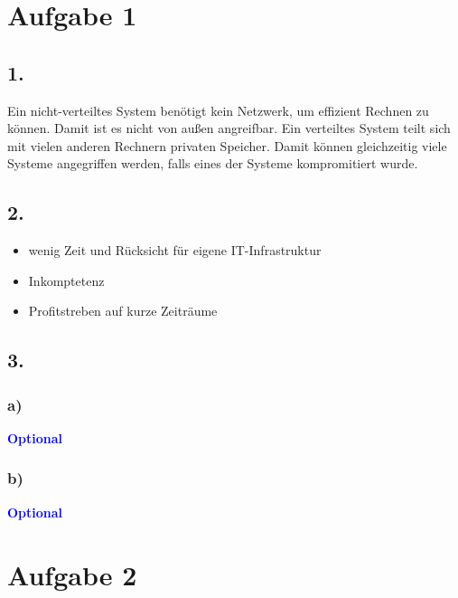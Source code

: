 \documentclass[a4paper,11pt]{scrartcl}
\title{\titleinfo}
\author{\authorinfo}
\newcommand{\opt}{\textcolor{blue}{\textbf{Optional}}}
\begin{document}
\maketitle

\section*{Aufgabe 1}
\subsection*{1.}
Ein nicht-verteiltes System benötigt kein Netzwerk, um effizient Rechnen zu
können. Damit ist es nicht von außen angreifbar. Ein verteiltes System teilt sich
mit vielen anderen Rechnern privaten Speicher. Damit können gleichzeitig viele
Systeme angegriffen werden, falls eines der Systeme kompromitiert wurde.

\subsection*{2.}
\begin{itemize}
	\item wenig Zeit und Rücksicht für eigene IT-Infrastruktur
    \item Inkomptetenz
    \item Profitstreben auf kurze Zeiträume
\end{itemize}

\subsection*{3.}
\subsubsection*{a)}
\opt

\subsubsection*{b)}
\opt
         
\section*{Aufgabe 2}
\end{document}
